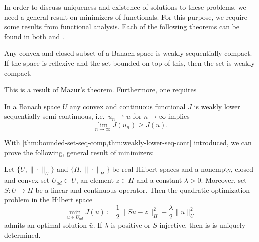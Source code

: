 \documentclass[../thesis.tex]{subfiles}
\begin{document}
In order to discuss uniqueness and existence of solutions to these problems, we need a general result on minimizers of functionals.
For this purpose, we require some results from functional analysis.
Each of the following theorems can be found in both \cite{Alt} and \cite{Werner}.
\begin{theorem}
\label{thm:bounded-set-seq-comp}
Any convex and closed subset of a Banach space is weakly sequentially compact.
If the space is reflexive and the set bounded on top of this, then the set is weakly compact.
\end{theorem}
This is a result of Mazur's theorem. Furthermore, one requires
\begin{theorem}
\label{thm:weakly-lower-seq-cont}
In a Banach space $U$ any convex and continuous functional $J$ is weakly lower sequentially semi-continuous, i.e.\ $u_n \rightharpoonup u$ for $n \to \infty$ implies
\[
	\lim_{n \to \infty} J(u_n) \geq J(u).
\]
\end{theorem}
With \cref{thm:bounded-set-seq-comp,thm:weakly-lower-seq-cont} introduced, we can prove the following, general result of minimizers:
\begin{theorem}
\label{thm:optimal-control-existence}
Let $\{ U, \| \cdot \|_U \}$ and $\{ H, \| \cdot \|_H \}$ be real Hilbert spaces and a nonempty, closed and convex set $U_{ad} \subset U$, an element $z \in H$ and a constant $\lambda > 0$.
Moreover, set $S : U \to H$ be a linear and continuous operator.
Then the quadratic optimization problem in the Hilbert space
\[
	\min_{u \in U_{ad}} J(u) \coloneqq \frac{1}{2} \| Su - z \|_H^2 + \frac{\lambda}{2} \| u \|_U^2
\]
admits an optimal solution $\bar{u}$. If $\lambda$ is positive or $S$ injective, then is is uniquely determined.
\end{theorem}
\end{document}
